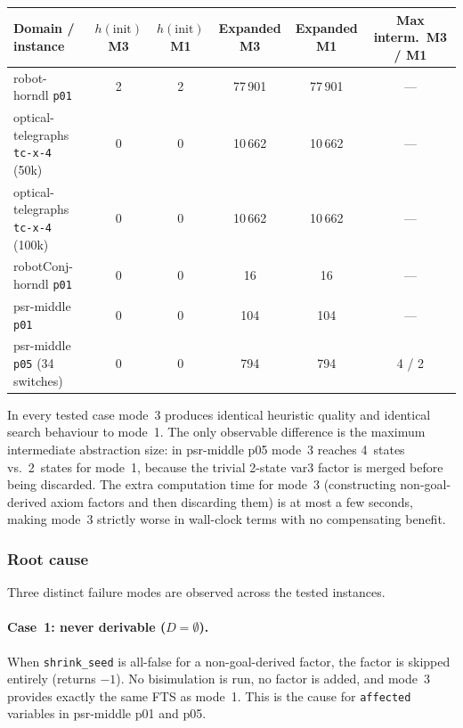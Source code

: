 \documentclass[11pt,a4paper]{article}
\begin{document}
\begin{center}
\begin{tabular}{lccccc}
\toprule
\textbf{Domain / instance} & \boldmath$h(\text{init})$ M3 &
  \boldmath$h(\text{init})$ M1 & \textbf{Expanded M3} &
  \textbf{Expanded M1} & \textbf{Max interm.\ M3 / M1} \\
\midrule
robot-horndl \texttt{p01}
  & 2 & 2 & 77\,901 & 77\,901 & --- \\
optical-telegraphs \texttt{tc-x-4} (50k)
  & 0 & 0 & 10\,662 & 10\,662 & --- \\
optical-telegraphs \texttt{tc-x-4} (100k)
  & 0 & 0 & 10\,662 & 10\,662 & --- \\
robotConj-horndl \texttt{p01}
  & 0 & 0 & 16      & 16      & --- \\
psr-middle \texttt{p01}
  & 0 & 0 & 104     & 104     & --- \\
psr-middle \texttt{p05} (34 switches)
  & 0 & 0 & 794     & 794     & 4 / 2 \\
\bottomrule
\end{tabular}
\end{center}

In every tested case mode~3 produces identical heuristic quality and
identical search behaviour to mode~1.  The only observable difference is
the maximum intermediate abstraction size: in psr-middle p05 mode~3
reaches 4~states vs.\ 2~states for mode~1, because the trivial 2-state
var3 factor is merged before being discarded.  The extra computation time
for mode~3 (constructing non-goal-derived axiom factors and then discarding
them) is at most a few seconds, making mode~3 strictly worse in wall-clock
terms with no compensating benefit.

\subsubsection*{Root cause}

Three distinct failure modes are observed across the tested instances.

\paragraph{Case~1: never derivable ($D = \emptyset$).}
When \texttt{shrink\_seed} is all-false for a non-goal-derived factor, the
factor is skipped entirely (returns $-1$).  No bisimulation is run, no factor
is added, and mode~3 provides exactly the same FTS as mode~1.  This is the
cause for \texttt{affected} variables in psr-middle p01 and p05.
\end{document}

